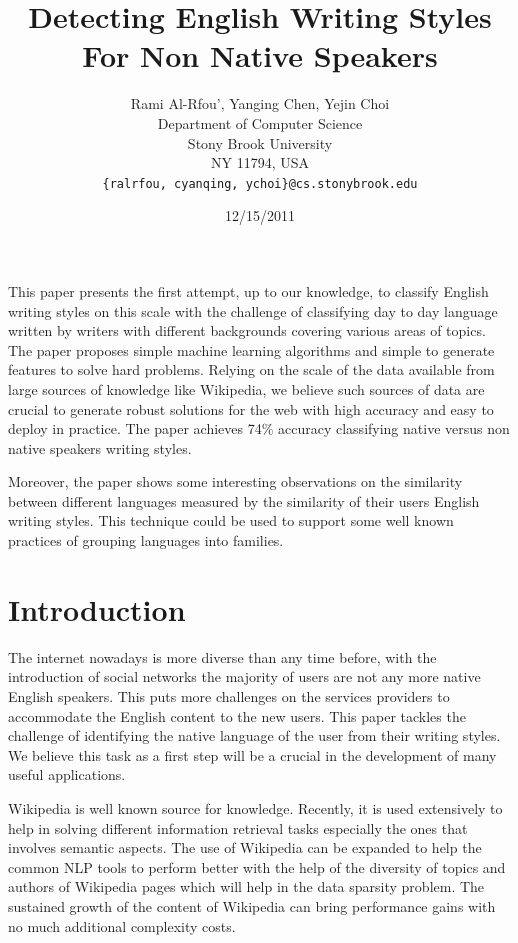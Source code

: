 \documentclass[11pt]{article}
\title{Detecting English Writing Styles For Non Native Speakers}
\author{Rami Al-Rfou', Yanging Chen, Yejin Choi \\
  Department of Computer Science \\
  Stony Brook University \\
  NY 11794, USA \\
  {\tt \{ralrfou, cyanqing, ychoi\}@cs.stonybrook.edu}}
\date{12/15/2011}
\begin{document}
\maketitle
\begin{abstract}
\end{abstract}


This paper presents the first attempt, up to our knowledge, to classify English writing styles on this scale with the challenge of classifying day to day language written by writers with different backgrounds covering various areas of topics. The paper proposes simple machine learning algorithms and simple to generate features to solve hard problems. Relying on the scale of the data available from large sources of knowledge like Wikipedia, we believe such sources of data are crucial to generate robust solutions for the web with high accuracy and easy to deploy in practice. The paper achieves 74\% accuracy classifying native versus non native speakers writing styles.

Moreover, the paper shows some interesting observations on the similarity between different languages measured by the similarity of their users English writing styles. This technique could be used to support some well known practices of grouping languages into families.

\section{Introduction}
The internet nowadays is more diverse than any time before, with the introduction of social networks the majority of users are not any more native English speakers. This puts more challenges on the services providers to accommodate the English content to the new users. This paper tackles the challenge of identifying the native language of the user from their writing styles. We believe this task as a first step will be a crucial in the development of many useful applications.

Wikipedia is well known source for knowledge. Recently, it is used extensively to help in solving different information retrieval tasks especially the ones that involves semantic aspects. The use of Wikipedia can be expanded to help the common NLP tools to perform better with the help of the diversity of topics and authors of Wikipedia pages which will help in the data sparsity problem. The sustained growth of the content of Wikipedia can bring performance gains with no much additional complexity costs.
\end{document}
